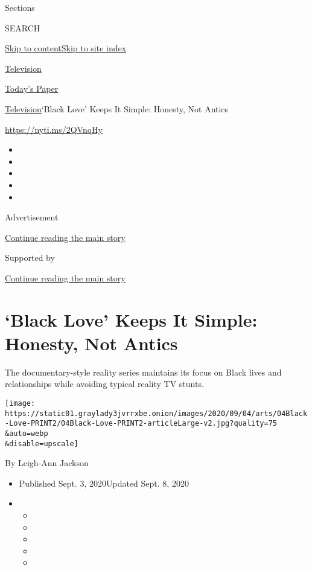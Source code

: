 Sections

SEARCH

\protect\hyperlink{site-content}{Skip to
content}\protect\hyperlink{site-index}{Skip to site index}

\href{https://www.nytimes3xbfgragh.onion/section/arts/television}{Television}

\href{https://myaccount.nytimes3xbfgragh.onion/auth/login?response_type=cookie\&client_id=vi}{}

\href{https://www.nytimes3xbfgragh.onion/section/todayspaper}{Today's
Paper}

\href{/section/arts/television}{Television}\textbar{}`Black Love' Keeps
It Simple: Honesty, Not Antics

\url{https://nyti.ms/2QVnqHy}

\begin{itemize}
\item
\item
\item
\item
\item
\end{itemize}

Advertisement

\protect\hyperlink{after-top}{Continue reading the main story}

Supported by

\protect\hyperlink{after-sponsor}{Continue reading the main story}

\hypertarget{black-love-keeps-it-simple-honesty-not-antics}{%
\section{`Black Love' Keeps It Simple: Honesty, Not
Antics}\label{black-love-keeps-it-simple-honesty-not-antics}}

The documentary-style reality series maintains its focus on Black lives
and relationships while avoiding typical reality TV stunts.

\texttt{[image: https://static01.graylady3jvrrxbe.onion/images/2020/09/04/arts/04Black-Love-PRINT2/04Black-Love-PRINT2-articleLarge-v2.jpg?quality=75\\\&auto=webp\\\&disable=upscale]}

By Leigh-Ann Jackson

\begin{itemize}
\item
  Published Sept. 3, 2020Updated Sept. 8, 2020
\item
  \begin{itemize}
  \item
  \item
  \item
  \item
  \item
  \end{itemize}
\end{itemize}

